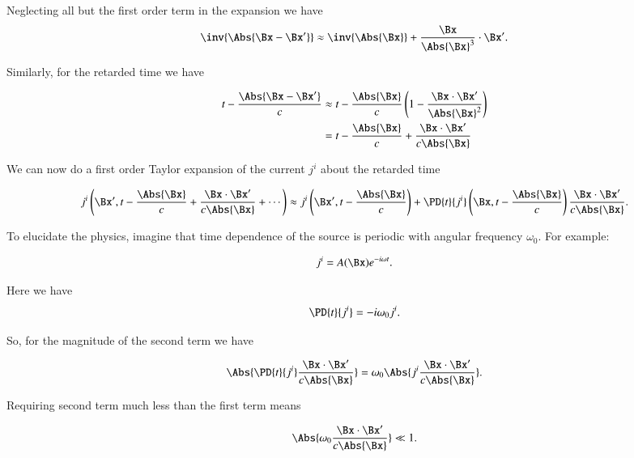 Neglecting all but the first order term in the expansion we have
\begin{equation}\label{eqn:relativisticElectrodynamicsL20:30}
\inv{\Abs{\Bx - \Bx'} }
\approx 
\inv{\Abs{\Bx} } + \frac{\Bx}{\Abs{\Bx}^3} \cdot \Bx' .
\end{equation}

Similarly, for the retarded time we have

\begin{align*}
t - \frac{\Abs{\Bx - \Bx'} }{c} 
&\approx t - \frac{\Abs{\Bx} }{c} \left( 1 - \frac{\Bx \cdot \Bx'}{\Abs{\Bx}^2} \right) \\
&= t - \frac{\Abs{\Bx} }{c} + \frac{\Bx \cdot \Bx'}{c \Abs{\Bx} }
\end{align*}

We can now do a first order Taylor expansion of the current $j^i$ about the retarded time

\begin{equation}\label{eqn:relativisticElectrodynamicsL20:50}
j^i\left(\Bx', t - \frac{\Abs{\Bx} }{c} + \frac{\Bx \cdot \Bx'}{c \Abs{\Bx} } + \cdots \right)
\approx
j^i\left(\Bx', t - \frac{\Abs{\Bx} }{c}\right) + \PD{t}{j^i} \left(\Bx, t - \frac{\Abs{\Bx} }{c}\right) \frac{\Bx \cdot \Bx'}{c \Abs{\Bx} }.
\end{equation}

To elucidate the physics, imagine that time dependence of the source is periodic with angular frequency $\omega_0$.  For example:

\begin{equation}\label{eqn:relativisticElectrodynamicsL20:n}
j^i = A(\Bx) e^{-i \omega t}.
\end{equation}

Here we have
\begin{equation}\label{eqn:relativisticElectrodynamicsL20:70}
\PD{t}{j^i} = -i \omega_0 j^i.
\end{equation}

So, for the magnitude of the second term we have

\begin{equation}\label{eqn:relativisticElectrodynamicsL20:90}
\Abs{\PD{t}{j^i} \frac{\Bx \cdot \Bx'}{c \Abs{\Bx} }} = \omega_0 \Abs{j^i \frac{\Bx \cdot \Bx'}{c \Abs{\Bx} }}.
\end{equation}

Requiring second term much less than the first term means 

\begin{equation}\label{eqn:relativisticElectrodynamicsL20:110}
\Abs{\omega_0 \frac{\Bx \cdot \Bx'}{c \Abs{\Bx} }} \ll 1.
\end{equation}

